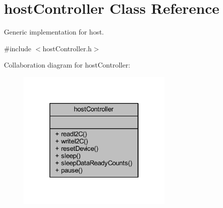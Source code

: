\hypertarget{classhost_controller}{}\section{host\+Controller Class Reference}
\label{classhost_controller}


Generic implementation for host.  




{\ttfamily \#include $<$host\+Controller.\+h$>$}



Collaboration diagram for host\+Controller\+:\nopagebreak
\begin{figure}[H]
\begin{center}
\leavevmode
\includegraphics[width=214pt]{classhost_controller__coll__graph}
\end{center}
\end{figure}
